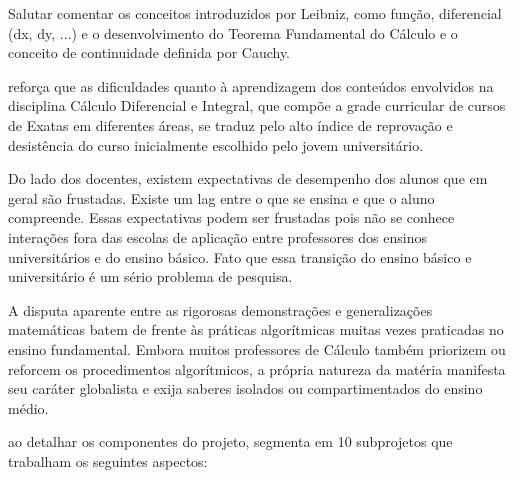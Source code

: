 \documentclass[
	12pt,				%
	openright,			%
	oneside,
	a4paper,			%
	chapter=TITLE,		%
	section=TITLE,		%
	sumario=abnt-6027-2012,
	english,			%
	brazil				%
]{abntex2}
\begin{document}
	Salutar comentar os conceitos introduzidos por Leibniz, como função, diferencial (dx, dy, ...) e o desenvolvimento do Teorema Fundamental do Cálculo e o conceito de continuidade definida por Cauchy. 
	
	 reforça que as dificuldades quanto à aprendizagem dos conteúdos envolvidos na disciplina Cálculo Diferencial e Integral, que compõe a grade curricular de cursos de Exatas em diferentes áreas, se traduz pelo alto índice de reprovação e desistência do curso inicialmente escolhido pelo jovem universitário.
	
	Do lado dos docentes, existem expectativas de desempenho dos alunos que em geral são frustadas. Existe um lag entre o que se ensina e que o aluno compreende. Essas expectativas podem ser frustadas pois não se conhece interações fora das escolas de aplicação entre professores dos ensinos universitários e do ensino básico. Fato que essa transição do ensino básico e universitário é um sério problema de pesquisa.
	
	A disputa aparente entre as rigorosas demonstrações e generalizações matemáticas batem de frente às práticas algorítmicas muitas vezes praticadas no ensino fundamental. Embora muitos professores de Cálculo também priorizem ou reforcem os procedimentos algorítmicos, a própria natureza da matéria manifesta seu caráter globalista e exija saberes isolados ou compartimentados do ensino médio.
	
	 ao detalhar os componentes do projeto, segmenta em 10 subprojetos que trabalham os seguintes aspectos:
	
\end{document}
